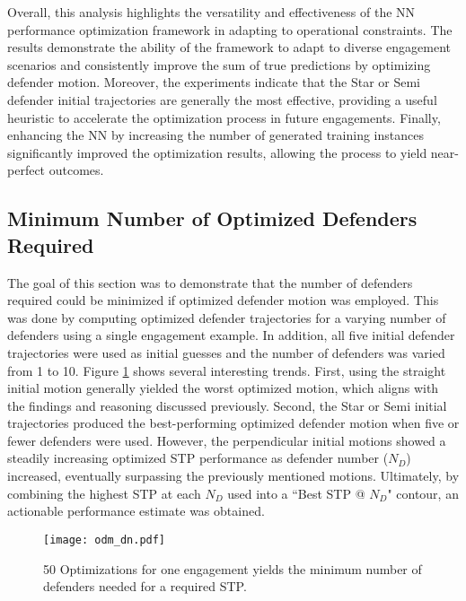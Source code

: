 \documentclass[journal]{IEEEtran} %
\begin{document}
Overall, this analysis highlights the versatility and effectiveness of the NN performance optimization framework in adapting to operational constraints. The results demonstrate the ability of the framework to adapt to diverse engagement scenarios and consistently improve the sum of true predictions by optimizing defender motion. Moreover, the experiments indicate that the Star or Semi defender initial trajectories are generally the most effective, providing a useful heuristic to accelerate the optimization process in future engagements. Finally, enhancing the NN by increasing the number of generated training instances significantly improved the optimization results, allowing the process to yield near-perfect outcomes.


\subsection{Minimum Number of Optimized Defenders Required}
\label{sec:results min num def}


The goal of this section was to demonstrate that the number of defenders required could be minimized if optimized defender motion was employed. This was done by computing optimized defender trajectories for a varying number of defenders using a single engagement example. In addition, all five initial defender trajectories were used as initial guesses and the number of defenders was varied from 1 to 10. Figure \ref{fig:odm_dn} shows several interesting trends. First, using the straight initial motion generally yielded the worst optimized motion, which aligns with the findings and reasoning discussed previously. Second, the Star or Semi initial trajectories produced the best-performing optimized defender motion when five or fewer defenders were used. However, the perpendicular initial motions showed a steadily increasing optimized STP performance as defender number ($N_D$) increased, eventually surpassing the previously mentioned motions. Ultimately, by combining the highest STP at each $N_D$ used into a ``Best STP @ $N_D$" contour, an actionable performance estimate was obtained.

\begin{figure}[h]
    \centering
    \texttt{[image: odm\_dn.pdf]}
    \caption{50 Optimizations for one engagement yields the minimum number of defenders needed for a required STP.}
    \label{fig:odm_dn}
\end{figure}
\end{document}
